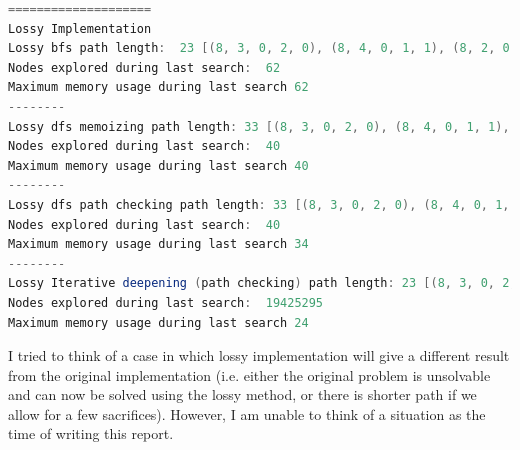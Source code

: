 \documentclass[9.5pt]{extarticle}
\begin{document}
\begin{lstlisting}[language=java,caption={Output for lossy algorithm for start state of (8,5,0,0,1) and E = 0}]
====================
Lossy Implementation
Lossy bfs path length:  23 [(8, 3, 0, 2, 0), (8, 4, 0, 1, 1), (8, 2, 0, 3, 0), (8, 3, 0, 2, 1), (6, 3, 2, 2, 0), (6, 4, 2, 1, 1), (5, 3, 3, 2, 0), (5, 4, 3, 1, 1), (5, 2, 3, 3, 0), (5, 3, 3, 2, 1), (4, 2, 4, 3, 0), (4, 3, 4, 2, 1), (4, 1, 4, 4, 0), (4, 2, 4, 3, 1), (3, 1, 5, 4, 0), (3, 2, 5, 3, 1), (3, 0, 5, 5, 0), (3, 1, 5, 4, 1), (2, 0, 6, 5, 0), (2, 1, 6, 4, 1), (1, 0, 7, 5, 0), (1, 1, 7, 4, 1), (0, 0, 8, 5, 0)]
Nodes explored during last search:  62
Maximum memory usage during last search 62
--------
Lossy dfs memoizing path length: 33 [(8, 3, 0, 2, 0), (8, 4, 0, 1, 1), (8, 2, 0, 3, 0), (8, 3, 0, 2, 1), (6, 3, 2, 2, 0), (6, 4, 2, 1, 1), (5, 4, 3, 1, 0), (5, 5, 3, 0, 1), (5, 3, 3, 2, 0), (5, 4, 3, 1, 1), (5, 2, 3, 3, 0), (5, 3, 3, 2, 1), (4, 3, 4, 2, 0), (4, 4, 4, 1, 1), (4, 2, 4, 3, 0), (4, 3, 4, 2, 1), (4, 1, 4, 4, 0), (4, 2, 4, 3, 1), (3, 2, 5, 3, 0), (3, 3, 5, 2, 1), (3, 1, 5, 4, 0), (3, 2, 5, 3, 1), (3, 0, 5, 5, 0), (3, 1, 5, 4, 1), (2, 1, 6, 4, 0), (2, 2, 6, 3, 1), (2, 0, 6, 5, 0), (2, 1, 6, 4, 1), (1, 0, 7, 5, 0), (1, 1, 7, 4, 1), (0, 1, 8, 4, 0), (0, 2, 8, 3, 1), (0, 0, 8, 5, 0)]
Nodes explored during last search:  40
Maximum memory usage during last search 40
--------
Lossy dfs path checking path length: 33 [(8, 3, 0, 2, 0), (8, 4, 0, 1, 1), (8, 2, 0, 3, 0), (8, 3, 0, 2, 1), (6, 3, 2, 2, 0), (6, 4, 2, 1, 1), (5, 4, 3, 1, 0), (5, 5, 3, 0, 1), (5, 3, 3, 2, 0), (5, 4, 3, 1, 1), (5, 2, 3, 3, 0), (5, 3, 3, 2, 1), (4, 3, 4, 2, 0), (4, 4, 4, 1, 1), (4, 2, 4, 3, 0), (4, 3, 4, 2, 1), (4, 1, 4, 4, 0), (4, 2, 4, 3, 1), (3, 2, 5, 3, 0), (3, 3, 5, 2, 1), (3, 1, 5, 4, 0), (3, 2, 5, 3, 1), (3, 0, 5, 5, 0), (3, 1, 5, 4, 1), (2, 1, 6, 4, 0), (2, 2, 6, 3, 1), (2, 0, 6, 5, 0), (2, 1, 6, 4, 1), (1, 0, 7, 5, 0), (1, 1, 7, 4, 1), (0, 1, 8, 4, 0), (0, 2, 8, 3, 1), (0, 0, 8, 5, 0)]
Nodes explored during last search:  40
Maximum memory usage during last search 34
--------
Lossy Iterative deepening (path checking) path length: 23 [(8, 3, 0, 2, 0), (8, 4, 0, 1, 1), (8, 2, 0, 3, 0), (8, 3, 0, 2, 1), (6, 3, 2, 2, 0), (6, 4, 2, 1, 1), (5, 3, 3, 2, 0), (5, 4, 3, 1, 1), (5, 2, 3, 3, 0), (5, 3, 3, 2, 1), (4, 2, 4, 3, 0), (4, 3, 4, 2, 1), (4, 1, 4, 4, 0), (4, 2, 4, 3, 1), (3, 1, 5, 4, 0), (3, 2, 5, 3, 1), (3, 0, 5, 5, 0), (3, 1, 5, 4, 1), (2, 0, 6, 5, 0), (2, 1, 6, 4, 1), (1, 0, 7, 5, 0), (1, 1, 7, 4, 1), (0, 0, 8, 5, 0)]
Nodes explored during last search:  19425295
Maximum memory usage during last search 24
\end{lstlisting}

I tried to think of a case in which lossy implementation will give a different result from the original implementation (i.e. either the original problem is unsolvable and can now be solved using the lossy method, or there is shorter path if we allow for a few sacrifices). However, I am unable to think of a situation as the time of writing this report.\\
\end{document}
